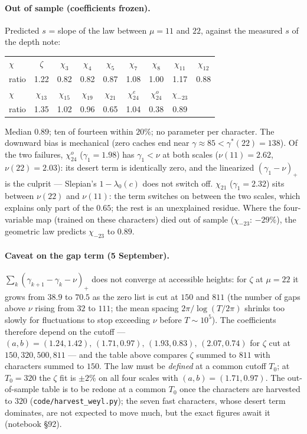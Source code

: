 \documentclass[11pt]{article}
\begin{document}
\paragraph{Out of sample (coefficients frozen).} Predicted $s$ = slope of the law between $\mu=11$ and $22$, against the measured $s$ of the depth note:
\begin{center}\small
\begin{tabular}{lcccccccc}\toprule
$\chi$ & $\zeta$ & $\chi_3$ & $\chi_4$ & $\chi_5$ & $\chi_7$ & $\chi_8$ & $\chi_{11}$ & $\chi_{12}$\\
ratio & 1.22 & 0.82 & 0.82 & 0.87 & 1.08 & 1.00 & 1.17 & 0.88\\\midrule
$\chi$ & $\chi_{13}$ & $\chi_{15}$ & $\chi_{19}$ & $\chi_{21}$ & $\chi_{24}^e$ & $\chi_{24}^o$ & $\chi_{-23}$ & \\
ratio & 1.35 & 1.02 & 0.96 & 0.65 & 1.04 & 0.38 & 0.89 & \\\bottomrule
\end{tabular}
\end{center}
Median $0.89$; ten of fourteen within $20\%$; no parameter per character. The downward bias is mechanical (zero caches end near $\gamma\approx85<\gamma^*(22)=138$). Of the two failures, $\chi_{24}^o$ ($\gamma_1=1.98$) has $\gamma_1<\nu$ at both scales ($\nu(11)=2.62$, $\nu(22)=2.03$): its desert term is identically zero, and the linearized $(\gamma_1-\nu)_+$ is the culprit --- Slepian's $1-\lambda_0(c)$ does not switch off. $\chi_{21}$ ($\gamma_1=2.32$) sits between $\nu(22)$ and $\nu(11)$: the term switches on between the two scales, which explains only part of the $0.65$; the rest is an unexplained residue. Where the four-variable map (trained on these characters) died out of sample ($\chi_{-23}$: $-29\%$), the geometric law predicts $\chi_{-23}$ to $0.89$.

\paragraph{Caveat on the gap term (5 September).} $\sum_k(\gamma_{k+1}-\gamma_k-\nu)_+$ does not converge at accessible heights: for $\zeta$ at $\mu=22$ it grows from $38.9$ to $70.5$ as the zero list is cut at $150$ and $811$ (the number of gaps above $\nu$ rising from $32$ to $111$; the mean spacing $2\pi/\log(T/2\pi)$ shrinks too slowly for fluctuations to stop exceeding $\nu$ before $T\sim10^5$). The coefficients therefore depend on the cutoff --- $(a,b)=(1.24,1.42),\,(1.71,0.97),\,(1.93,0.83),\,(2.07,0.74)$ for $\zeta$ cut at $150,320,500,811$ --- and the table above compares $\zeta$ summed to $811$ with characters summed to $150$. The law must be \emph{defined} at a common cutoff $T_0$; at $T_0=320$ the $\zeta$ fit is $\pm2\%$ on all four scales with $(a,b)=(1.71,0.97)$. The out-of-sample table is to be redone at a common $T_0$ once the characters are harvested to $320$ (\texttt{code/harvest\_weyl.py}); the seven fast characters, whose desert term dominates, are not expected to move much, but the exact figures await it (notebook \S92).
\end{document}
